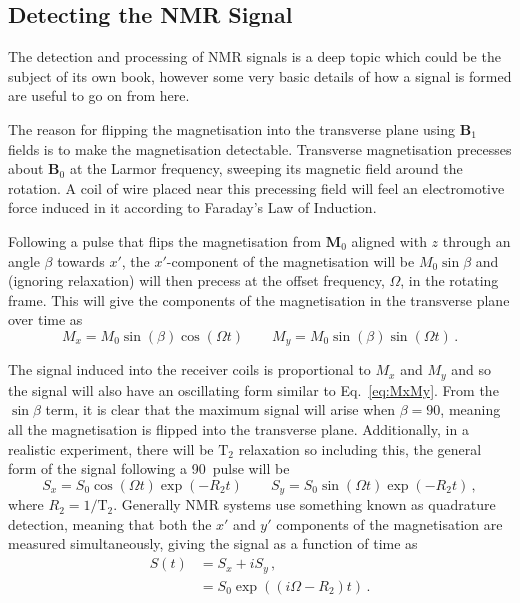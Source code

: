 \subsection{Detecting the NMR Signal}
The detection and processing of \ac{NMR} signals is a deep topic which could be the subject of its own book, however some very basic details of how a signal is formed are useful to go on from here.
 
The reason for flipping the magnetisation into the transverse plane using $\mathbf{B}_1$ fields is to make the magnetisation detectable. 
Transverse magnetisation precesses about $\mathbf{B}_0$ at the Larmor frequency, sweeping its magnetic field around the rotation. 
A coil of wire placed near this precessing field will feel an electromotive force induced in it according to Faraday's Law of Induction\cite{Haacke1999}.

Following a pulse that flips the magnetisation from $\mathbf{M}_0$ aligned with $z$ through an angle $\beta$ towards $x'$, the $x'$-component of the magnetisation will be $M_0\sin\beta$ and (ignoring relaxation) will then precess at the offset frequency, $\Omega$, in the rotating frame. This will give the components of the magnetisation in the transverse plane over time as 
\begin{equation}
M_x = M_0\sin(\beta)\cos(\Omega t) \qquad M_y = M_0\sin(\beta)\sin(\Omega t)\,.\label{eq:MxMy}
\end{equation}

The signal induced into the receiver coils is proportional to $M_x$ and $M_y$ and so the signal will also have an oscillating form similar to Eq.\ \ref{eq:MxMy}.
From the $\sin\beta$ term, it is clear that the maximum signal will arise when $\beta = 90$\degree, meaning all the magnetisation is flipped into the transverse plane. 
Additionally, in a realistic experiment, there will be $\mathrm{T_2}$ relaxation so including this, the general form of the signal following a 90\degree\ pulse will be\cite{DeGraaf2007} 
\begin{equation}
S_x = S_0\cos(\Omega t)\exp\left(-R_2t\right) \qquad S_y = S_0\sin(\Omega t)\exp\left(-R_2t\right)\,,
\end{equation}
where $R_2 = 1/\mathrm{T}_2$.
Generally \ac{NMR} systems use something known as quadrature detection, meaning that both the $x'$ and $y'$ components of the magnetisation are measured simultaneously\cite{Levitt2008}, giving the signal as a function of time as 
\begin{align}
	S(t) &= S_x + iS_y\,,\nonumber\\
		 &= S_0\exp((i\Omega - R_2)t)\,.\label{eq:fid}
\end{align}  


